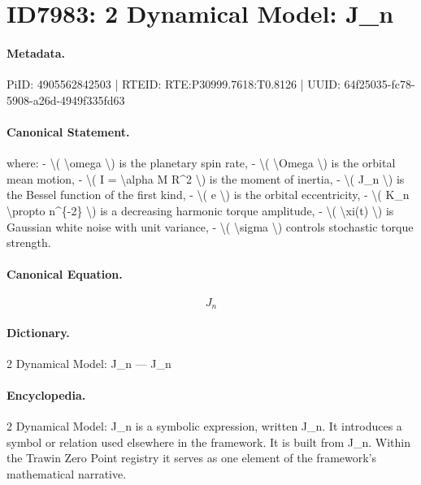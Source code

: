 \section*{ID7983: 2 Dynamical Model: J\_n}
\paragraph{Metadata.}
PiID: 4905562842503 | RTEID: RTE:P30999.7618:T0.8126 | UUID: 64f25035-fc78-5908-a26d-4949f335fd63

\paragraph{Canonical Statement.}
where: - \textbackslash{}( \textbackslash{}omega \textbackslash{}) is the planetary spin rate, - \textbackslash{}( \textbackslash{}Omega \textbackslash{}) is the orbital mean motion, - \textbackslash{}( I = \textbackslash{}alpha M R\textasciicircum{}2 \textbackslash{}) is the moment of inertia, - \textbackslash{}( J\_n \textbackslash{}) is the Bessel function of the first kind, - \textbackslash{}( e \textbackslash{}) is the orbital eccentricity, - \textbackslash{}( K\_n \textbackslash{}propto n\textasciicircum{}\{-2\} \textbackslash{}) is a decreasing harmonic torque amplitude, - \textbackslash{}( \textbackslash{}xi(t) \textbackslash{}) is Gaussian white noise with unit variance, - \textbackslash{}( \textbackslash{}sigma \textbackslash{}) controls stochastic torque strength.

\paragraph{Canonical Equation.}
\[
J_n
\]

\paragraph{Dictionary.}
2 Dynamical Model: J\_n — J\_n

\paragraph{Encyclopedia.}
2 Dynamical Model: J\_n is a symbolic expression, written J\_n. It introduces a symbol or relation used elsewhere in the framework. It is built from J\_n. Within the Trawin Zero Point registry it serves as one element of the framework's mathematical narrative.
